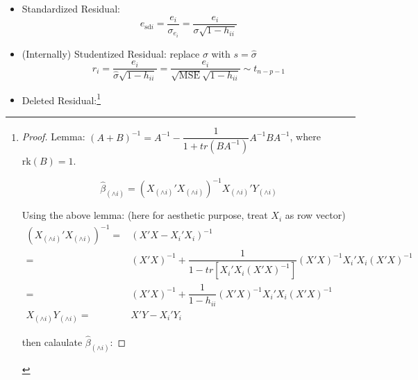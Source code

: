 \begin{itemize}[topsep=2pt,itemsep=2pt]
    \item Standardized Residual:
    \begin{equation}
         e_{\mathrm{sd}i}=\dfrac{e_i}{\sigma _{e_i}}=\dfrac{e_i}{\sigma \sqrt{1-h_{ii}}}
    \end{equation}
    \item (Internally) Studentized Residual: replace $ \sigma  $ with $ s=\hat{\sigma } $
    \begin{equation}\label{EqaInternalStudentizedResidual}
         r_i=\dfrac{e_i}{\hat{\sigma }\sqrt{1-h_{ii}}}=\dfrac{e_i}{\sqrt{\mathrm{MSE} }\sqrt{1-h_{ii}}}\sim t_{n-p-1}
    \end{equation}
    
    \item Deleted Residual:\footnote{
        \begin{proof}
            
        
    
        Lemma: $ (A+B)^{-1}=A^{-1}-\dfrac{1}{1+tr(BA^{-1})}A^{-1}BA^{-1} $, where $ \mathrm{rk}(B)=1  $.

        

        \begin{equation}
            \hat{\beta }_{(\wedge i)}=(X_{(\wedge i)}'X_{(\wedge i)})^{-1}X_{(\wedge i)}'Y_{(\wedge i)} 
        \end{equation}
        
        Using the above lemma: (here for aesthetic purpose, treat $ X_i $ as row vector)
        \begin{align}
            (X_{(\wedge i)}'X_{(\wedge i)})^{-1}=&(X'X-X_i'X_i)^{-1}\\
            =&(X'X)^{-1}+\dfrac{1}{1-tr[X_i'X_i(X'X)^{-1}]}(X'X)^{-1}X_i'X_i(X'X)^{-1}\\
            =&(X'X)^{-1}+\dfrac{1}{1-h_{ii}}(X'X)^{-1}X_i'X_i(X'X)^{-1}\\
            X_{(\wedge i)}Y_{(\wedge i)}=&X'Y-X_i'Y_i
        \end{align}

        then calaulate $ \hat{\beta }_{(\wedge i)} $:
   


\end{proof}}
\end{itemize}
